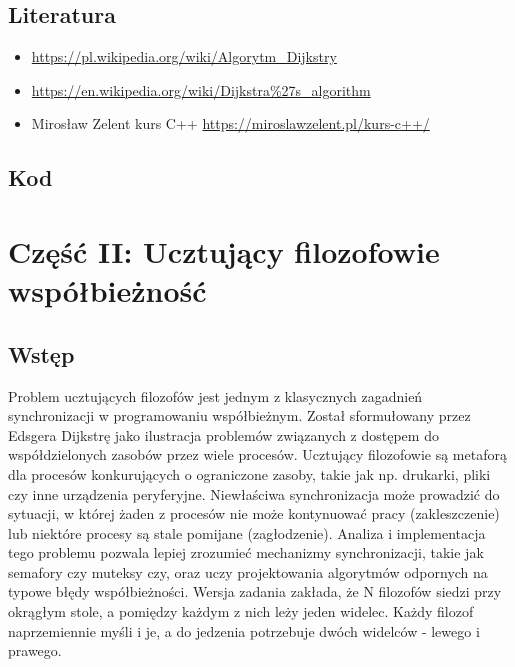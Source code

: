 \documentclass[a4paper,12pt]{article}
\begin{document}
        \subsection{Literatura}
            \vspace{1em}
            \begin{itemize}
                \item \url{https://pl.wikipedia.org/wiki/Algorytm_Dijkstry}
                \item \url{https://en.wikipedia.org/wiki/Dijkstra%27s_algorithm}
                \item Mirosław Zelent kurs C++ \url{https://miroslawzelent.pl/kurs-c++/}
            \end{itemize}
        \newpage
        \vspace*{2em}
        \subsection{Kod}
            \vspace{1em}
    \newpage
    \section{Część II: Ucztujący filozofowie współbieżność}
        \vspace{2em}
        \subsection{Wstęp}
            \vspace{1em}
            Problem ucztujących filozofów jest jednym z klasycznych zagadnień synchronizacji w programowaniu współbieżnym. Został sformułowany przez Edsgera Dijkstrę jako ilustracja problemów związanych z dostępem do współdzielonych zasobów przez wiele procesów. Ucztujący filozofowie są metaforą dla procesów konkurujących o ograniczone zasoby, takie jak np. drukarki, pliki czy inne urządzenia peryferyjne. Niewłaściwa synchronizacja może prowadzić do sytuacji, w której żaden z procesów nie może kontynuować pracy (zakleszczenie) lub niektóre procesy są stale pomijane (zagłodzenie). Analiza i implementacja tego problemu pozwala lepiej zrozumieć mechanizmy synchronizacji, takie jak semafory czy muteksy czy, oraz uczy projektowania algorytmów odpornych na typowe błędy współbieżności.
            Wersja zadania zakłada, że N filozofów siedzi przy okrągłym stole, a pomiędzy każdym z nich leży jeden widelec. Każdy filozof naprzemiennie myśli i je, a do jedzenia potrzebuje dwóch widelców - lewego i prawego.
        \vspace{2em}
\end{document}
